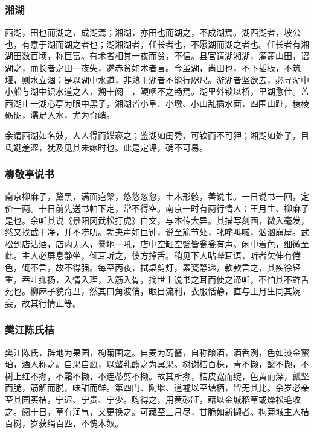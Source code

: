 \documentclass[]{article}
\begin{document}
\hypertarget{header-n378}{%
\subsubsection{湘湖}\label{header-n378}}

西湖，田也而湖之，成湖焉；湘湖，亦田也而湖之，不成湖焉。湖西湖者，坡公也，有意于湖而湖之者也；湖湘湖者，任长者也，不愿湖而湖之者也。任长者有湘湖田数百顷，称巨富。有术者相其一夜而贫，不信。县官请湖湘湖，灌萧山田，诏湖之，而长者之田一夜失，遂赤贫如术者言。今虽湖，尚田也，不下插板，不筑堰，则水立涸；是以湖中水道，非熟于湖者不能行咫尺。游湖者坚欲去，必寻湖中小船与湖中识水道之人，溯十阏三，鲠咽不之畅焉。湖里外锁以桥，里湖愈佳。盖西湖止一湖心亭为眼中黑子，湘湖皆小阜、小墩、小山乱插水面，四围山趾，棱棱砺砺，濡足入水，尤为奇峭。

余谓西湖如名妓，人人得而媟亵之；鉴湖如闺秀，可钦而不可狎；湘湖如处子，目氐娗羞涩，犹及见其未嫁时也。此是定评，确不可易。

\hypertarget{header-n383}{%
\subsubsection{柳敬亭说书}\label{header-n383}}

南京柳麻子，黧黑，满面疤槃，悠悠忽忽，土木形骸，善说书。一日说书一回，定价一两。十日前先送书帕下定，常不得空。南京一时有两行情人：王月生、柳麻子是也。余听其说《景阳冈武松打虎》白文，与本传大异。其描写刻画，微入毫发，然又找截干净，并不唠叨。勃夬声如巨钟，说至筋节处，叱咤叫喊，汹汹崩屋。武松到店沽酒，店内无人，謈地一吼，店中空缸空甓皆瓮瓮有声。闲中着色，细微至此。主人必屏息静坐，倾耳听之，彼方掉舌。稍见下人呫哔耳语，听者欠伸有倦色，辄不言，故不得强。每至丙夜，拭桌剪灯，素瓷静递，款款言之，其疾徐轻重，吞吐抑扬，入情入理，入筋入骨，摘世上说书之耳而使之谛听，不怕其不齚舌死也。柳麻子貌奇丑，然其口角波俏，眼目流利，衣服恬静，直与王月生同其婉娈，故其行情正等。

\hypertarget{header-n388}{%
\subsubsection{樊江陈氏桔}\label{header-n388}}

樊江陈氏，辟地为果园，枸菊围之。自麦为蒟酱，自称酿酒，酒香洌，色如淡金蜜珀，酒人称之。自果自蓏，以螫乳醴之为冥果。树谢桔百株，青不撷，酸不撷，不树上红不撷，不霜不撷，不连蒂剪不撷。故其所撷，桔皮宽而绽，色黄而深，瓤坚而脆，筋解而脱，味甜而鲜。第四门、陶堰、道墟以至塘栖，皆无其比。余岁必亲至其园买桔，宁迟、宁贵、宁少。购得之，用黄砂缸，藉以金城稻草或燥松毛收之。阅十日，草有润气，又更换之。可藏至三月尽，甘脆如新撷者。枸菊城主人桔百树，岁获绢百匹，不愧木奴。
\end{document}
